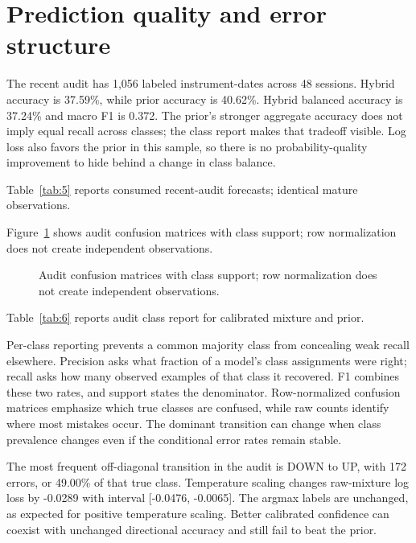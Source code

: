 \section{Prediction quality and error structure}\label{sec:section-06}

The recent audit has 1,056 labeled instrument-dates across 48 sessions. Hybrid accuracy is 37.59\%, while prior accuracy is 40.62\%. Hybrid balanced accuracy is 37.24\% and macro F1 is 0.372. The prior's stronger aggregate accuracy does not imply equal recall across classes; the class report makes that tradeoff visible. Log loss also favors the prior in this sample, so there is no probability-quality improvement to hide behind a change in class balance.

\noindent Table~\ref{tab:5} reports consumed recent-audit forecasts; identical mature observations.



\noindent Figure~\ref{fig:4} shows audit confusion matrices with class support; row normalization does not create independent observations.

\begin{figure}[htbp]\centering

\caption{Audit confusion matrices with class support; row normalization does not create independent observations.}\label{fig:4}
\end{figure}

\noindent Table~\ref{tab:6} reports audit class report for calibrated mixture and prior.



Per-class reporting prevents a common majority class from concealing weak recall elsewhere. Precision asks what fraction of a model's class assignments were right; recall asks how many observed examples of that class it recovered. F1 combines these two rates, and support states the denominator. Row-normalized confusion matrices emphasize which true classes are confused, while raw counts identify where most mistakes occur. The dominant transition can change when class prevalence changes even if the conditional error rates remain stable.

The most frequent off-diagonal transition in the audit is DOWN to UP, with 172 errors, or 49.00\% of that true class. Temperature scaling changes raw-mixture log loss by -0.0289 with interval [-0.0476, -0.0065]. The argmax labels are unchanged, as expected for positive temperature scaling. Better calibrated confidence can coexist with unchanged directional accuracy and still fail to beat the prior.

